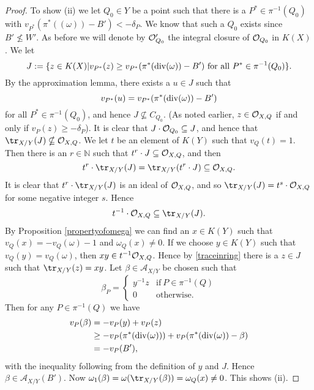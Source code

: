 \begin{proof}
    To show (ii) we let $Q_0\in Y$ be a point such that there is a $P^*\in \pi^{-1}(Q_0)$ with $v_{P^*}(\pi^*((\omega)) - B') < -\delta_P$.
    We know that such a $Q_0$ exists since $B' \nleq W'$.
    As before we will denote by ${\cal O}_{Q_0}'$ the integral closure of ${\cal O}_{Q_0}$ in $K(X)$.
    We let 
        \[
        J := \{ z\in K(X) | v_{P^*}(z) \geq v_{P^*}(\pi^*(\operatorname{div} (\omega)) - B')\ \text{for all}\ P^*\in \pi^{-1}(Q_0)\}.
        \]
    By the approximation lemma, there exists a $u\in J$ such that 
        \[
        v_{P^*}(u) = v_{P^*}(\pi^*(\operatorname{div} (\omega))-B')
        \]
    for all $P^*\in \pi^{-1}(Q_0)$, and hence $J\nsubseteq C_{Q_0}$.
    (As noted earlier, $z\in {\cal O}_{X,Q}$ if and only if $v_P(z) \geq -\delta_P$).
    It is clear that $J\cdot {\cal O}_{Q_0} \subseteq J$, and hence that $\tr_{X/Y}(J) \nsubseteq \cO_{X,Q}$.
    We let $t$ be an element of $K(Y)$ such that $v_Q(t) = 1$.
    Then there is an $r\in \mathbb N$ such that $t^r\cdot J \subseteq {\cal O}_{X,Q}$, and then 
        \[ 
        t^r\cdot \tr_{X/Y}(J) = \tr_{X/Y}(t^r\cdot J) \subseteq \cO_{X,Q}.
        \]
    It is clear that $t^r\cdot \tr_{X/Y} (J)$ is an ideal of ${\cal O}_{X,Q}$, and so $\tr_{X/Y}(J) = t^s\cdot \cO_{X,Q}$ for some negative integer $s$.
    Hence 
        \begin{equation}\label{traceinring}
        t^{-1}\cdot \cO_{X,Q} \subseteq \tr_{X/Y}(J).
        \end{equation}
    By Proposition \ref{propertyofomega} we can find an $x\in K(Y)$ such that $v_Q(x) = -v_Q(\omega) - 1$ and $\omega_Q(x) \neq 0$.
    If we choose $y\in K(Y)$ such that $v_Q(y) = v_Q(\omega)$, then $xy \in t^{-1}{\cal O}_{X,Q}$.
    Hence by \eqref{traceinring} there is a $z\in J$ such that $\tr_{X/Y} (z) = xy$.
    Let $\beta \in \mathcal{A}_{X/Y}$ be chosen  such that 
        \begin{equation*}
        \beta_P =
            \begin{cases}
            y^{-1}z & \text{if}\ P\in \pi^{-1}(Q) \\
            0 & \text{otherwise}.
            \end{cases}
        \end{equation*}
    Then for any $P\in \pi^{-1}(Q)$ we have
        \begin{align*}
        v_P(\beta) & =  -v_P(y) + v_P(z) \\
        & \geq  -v_P(\pi^*(\operatorname{div} (\omega))) + v_P(\pi^*(\operatorname{div} (\omega)) - \beta) \\
        & =  -v_P(B'),
        \end{align*}
    with the inequality following from the definition of $y$ and $J$.
    Hence $\beta \in \mathcal{A}_{X/Y}(B')$.
    Now $\omega_1(\beta) = \omega(\tr_{X/Y}(\beta)) = \omega_Q(x) \neq 0$.
    This shows (ii).
    

\end{proof}
